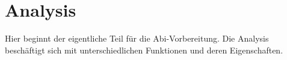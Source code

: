 \chapter{Analysis}
	Hier beginnt der eigentliche Teil für die Abi-Vorbereitung. Die Analysis
	beschäftigt sich mit unterschiedlichen Funktionen und deren Eigenschaften.

	

	

	

	
